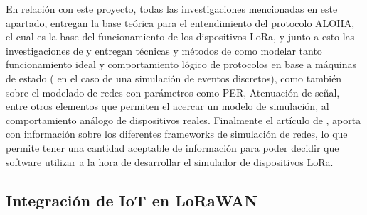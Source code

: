 \begin{justify}
En relación con este proyecto, todas las investigaciones mencionadas en este apartado, entregan la base teórica para el entendimiento del protocolo ALOHA, el cual es la base del funcionamiento de los dispositivos LoRa, y junto a esto las investigaciones de \cite{Abdullah} y \cite{simulato} entregan técnicas y métodos de como modelar tanto funcionamiento ideal y comportamiento lógico de protocolos en base a máquinas de estado ( en el caso de una simulación de eventos discretos), como también sobre el modelado de redes con parámetros como PER, Atenuación de señal, entre otros elementos que permiten el acercar un modelo de simulación, al comportamiento análogo de dispositivos reales. Finalmente el artículo de \cite{Murat}, aporta con información sobre los diferentes frameworks de simulación de redes, lo que permite tener una cantidad aceptable de información para poder decidir que software utilizar a la hora de desarrollar el simulador de dispositivos LoRa.

\subsection{Integración de IoT en LoRaWAN}


\end{justify}

